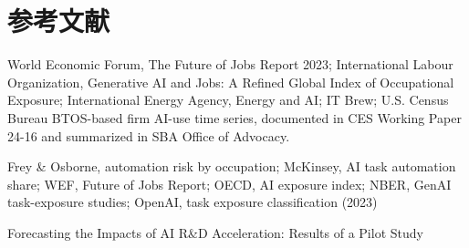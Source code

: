 \documentclass{mcmthesis}
\begin{document}
\section{参考文献}
\noindent [1]  World Economic Forum, The Future of Jobs Report 2023; International Labour Organization, Generative AI and Jobs: A Refined Global Index of Occupational Exposure; International Energy Agency, Energy and AI; IT Brew; U.S. Census Bureau BTOS-based firm AI-use time series, documented in CES Working Paper 24-16 and summarized in SBA Office of Advocacy.

\noindent [2] Frey \& Osborne, automation risk by occupation; McKinsey, AI task automation share; WEF, Future of Jobs Report; OECD, AI exposure index; NBER, GenAI task-exposure studies; OpenAI, task exposure classification (2023)

\noindent [3] Forecasting the Impacts of AI R\&D Acceleration: Results of a Pilot Study



\AImatter
\end{document}
